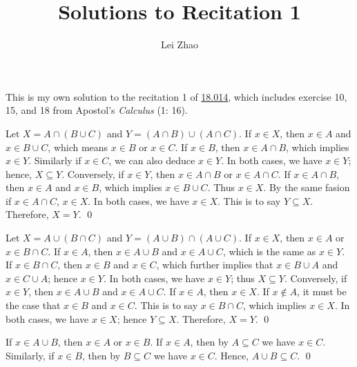 

\title{\bf Solutions to Recitation 1}
\author{Lei Zhao}


\maketitle
This is my own solution to the recitation 1 of
\href{https://ocw.mit.edu/courses/mathematics/18-014-calculus-with-theory-fall-2010/recitations/}{18.014},
which includes exercise 10, 15, and 18 from Apostol's \emph{Calculus}
(1: 16).


 {Let
  \(X = A \cap (B \cup C)\) and \(Y = (A \cap B) \cup (A \cap C)\).
  If \(x \in X\), then \(x \in A\) and \(x \in B \cup C\), which means
  \(x \in B\) or \(x \in C\).  If \(x \in B\), then
  \(x \in A \cap B\), which implies \(x \in Y\).  Similarly if
  \(x \in C\), we can also deduce \(x \in Y\).  In both cases, we have
  \(x \in Y\); hence, \(X \subseteq Y\).  Conversely, if \(x \in Y\),
  then \(x \in A \cap B\) or \(x \in A \cap C\).  If
  \(x \in A \cap B\), then \(x \in A\) and \(x \in B\), which implies
  \(x \in B \cup C\). Thus \(x \in X\).  By the same fasion if
  \(x \in A \cap C\), \(x \in X\).  In both cases, we have
  \(x \in X\).  This is to say \(Y \subseteq X\).  Therefore,
  \(X = Y\). \qed}

{\parasp Let \(X = A \cup (B \cap C)\) and
  \(Y = (A \cup B) \cap (A \cup C)\).  If \(x \in X\), then
  \(x \in A\) or \(x \in B \cap C\).  If \(x \in A\), then
  \(x \in A \cup B\) and \(x \in A \cup C\), which is the same as
  \(x \in Y\).  If \(x \in B \cap C\), then \(x \in B\) and
  \(x \in C\), which further implies that \(x \in B \cup A\) and
  \(x \in C \cup A\); hence \(x \in Y\).  In both cases, we have
  \(x \in Y\); thus \(X \subseteq Y\).  Conversely, if \(x \in Y\),
  then \(x \in A \cup B\) and \(x \in A \cup C\).  If \(x \in A\),
  then \(x \in X\).  If \(x \notin A\), it must be the case that
  \(x \in B\) and \(x \in C\).  This is to say \(x \in B \cap C\),
  which implies \(x \in X\).  In both cases, we have \(x \in X\);
  hence \(Y \subseteq X\).  Therefore, \(X = Y\). \qed}

  {If \(x \in A \cup B\), then \(x \in A\)
  or \(x \in B\).  If \(x \in A\), then by \(A \subseteq C\) we have
  \(x \in C\).  Similarly, if \(x \in B\), then by \(B \subseteq C\)
  we have \(x \in C\).  Hence, \(A \cup B \subseteq C\). \qed}


